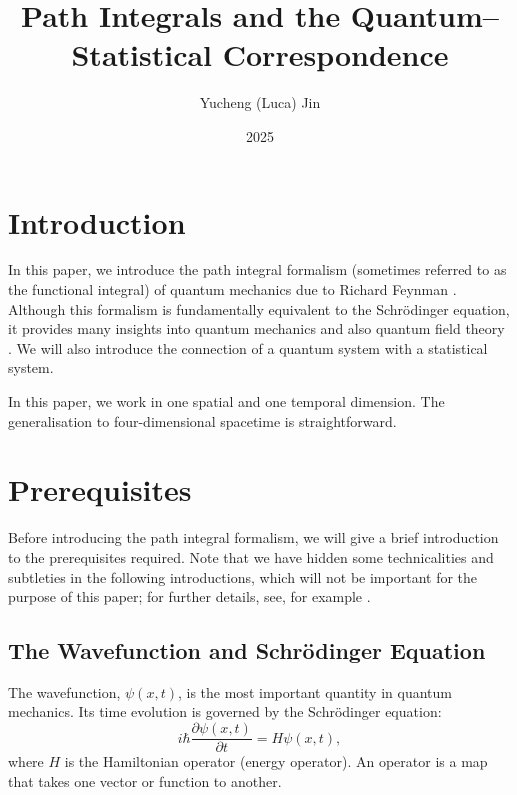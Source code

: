 \documentclass[12pt,a4paper]{article}
\title{Path Integrals and the Quantum--Statistical Correspondence}
\author{Yucheng (Luca) Jin}
\date{2025}
\begin{document}
\maketitle

\section{Introduction}
In this paper, we introduce the path integral formalism (sometimes referred to as the functional integral) of quantum mechanics due to Richard Feynman \cite{Feynman1948}. Although this formalism is fundamentally equivalent to the Schrödinger equation, it provides many insights into quantum mechanics and also quantum field theory \cite{TongQM, Peskin}. We will also introduce the connection of a quantum system with a statistical system.

In this paper, we work in one spatial and one temporal dimension.
The generalisation to four-dimensional spacetime is straightforward.

\section{Prerequisites}
Before introducing the path integral formalism, we will give a brief introduction to the prerequisites required. Note that we have hidden some technicalities and subtleties in the following introductions, which will not be important for the purpose of this paper; for further details, see, for example \cite{Kibble, Sakurai, TongQM}.

\subsection{The Wavefunction and Schrödinger Equation}
\label{SCH}
The wavefunction, $\psi(x,t)$, is the most important quantity in quantum mechanics. Its time evolution is governed by the Schrödinger equation:
\begin{equation}
    i\hbar\frac{\partial\psi(x,t)}{\partial t} = H\psi(x,t),
    \label{sch}
\end{equation}
where $H$ is the Hamiltonian operator (energy operator). An operator is a map that takes one vector or function to another.
\end{document}
